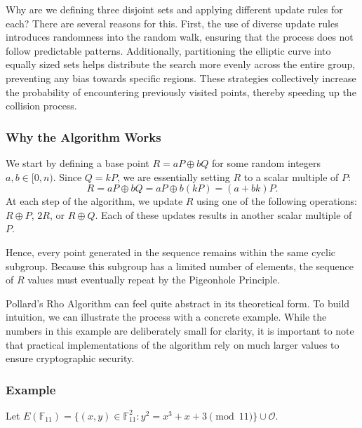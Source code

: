 \documentclass[11pt]{article}
\begin{document}
Why are we defining three disjoint sets and applying different update rules for each? There are several reasons for this. First, the use of diverse update rules introduces randomness into the random walk, ensuring that the process does not follow predictable patterns. Additionally, partitioning the elliptic curve into equally sized sets helps distribute the search more evenly across the entire group, preventing any bias towards specific regions. These strategies collectively increase the probability of encountering previously visited points, thereby speeding up the collision process.

\subsubsection{Why the Algorithm Works}
We start by defining a base point \(R=aP\oplus bQ\) for some random integers \(a,b\in[0,n)\). Since \(Q=kP\), we are essentially setting \(R\) to a scalar multiple of \(P\): \[R=aP\oplus bQ=aP\oplus b(kP)=(a+bk)P.\] 
At each step of the algorithm, we update \(R\) using one of the following operations: \(R \oplus P\), \(2R\), or \(R \oplus Q\). Each of these updates results in another scalar multiple of \(P\).

\vspace{0.3cm}

Hence, every point generated in the sequence remains within the same cyclic subgroup. Because this subgroup has a limited number of elements, the sequence of
\(R\) values must eventually repeat by the Pigeonhole Principle.

\vspace{0.3cm}

Pollard's Rho Algorithm can feel quite abstract in its theoretical form. To build intuition, we can illustrate the process with a concrete example. While the numbers in this example are deliberately small for clarity, it is important to note that practical implementations of the algorithm rely on much larger values to ensure cryptographic security.




\subsubsection{Example}

Let \(E(\mathbb{F}_{11})=\{(x,y)\in \mathbb{F}_{11}^2:y^2=x^3+x+3 \pmod{11}\}\cup\mathcal{O}\).

\vspace{0.3cm}
\end{document}
